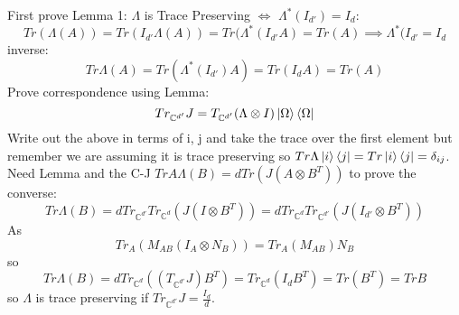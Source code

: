 \documentclass{article}
\begin{document}
First prove Lemma 1: $\Lambda$ is Trace Preserving $\iff$ $\Lambda^*(I_{d'})=I_d$:
$$
Tr(\Lambda(A)) = Tr(I_{d'} \Lambda(A)) = Tr( \Lambda^*(I_{d'}A) = Tr(A) \implies \Lambda^*(I_{d'} = I_d
$$
inverse:
$$
Tr \Lambda(A) = Tr(\Lambda^*(I_{d'}) A) = Tr(I_d A) = Tr(A)
$$
Prove correspondence using Lemma:
$$
Tr_{\mathbb{C}^{d'}} J = T_{\mathbb{C}^{d'}} (\Lambda \otimes I)\ket{\Omega}\bra{\Omega}
$$
Write out the above in terms of i, j and take the trace over the first element but remember we are assuming it is trace preserving so $Tr \Lambda \ket{i} \bra{j} = Tr \ket{i} \bra{j} = \delta_{ij}$. Need Lemma and the C-J $Tr A\Lambda(B) = d Tr (J(A\otimes B^T))$ to prove the converse:
$$
Tr \Lambda(B) = d Tr_{\mathbb{C}^{d'}}Tr_{\mathbb{C}^d} (J(I\otimes B^T)) = d Tr_{\mathbb{C}^{d}}Tr_{\mathbb{C}^{d'}} (J(I_{d'}\otimes B^T)) 
$$
As 
$$
Tr_A(M_{AB}(I_A \otimes N_B)) = Tr_A (M_{AB}) N_B
$$
so
$$
Tr \Lambda(B) = d Tr_{\mathbb{C}^d} ((T_{\mathbb{C}^{d'}} J)B^T) = Tr_{\mathbb{C}^d}(I_d B^T) = Tr(B^T) = Tr B 
$$
so $\Lambda$ is trace preserving if $Tr_{\mathbb{C}^{d'}}J = \frac{I_d}{d}$.
\end{document}
